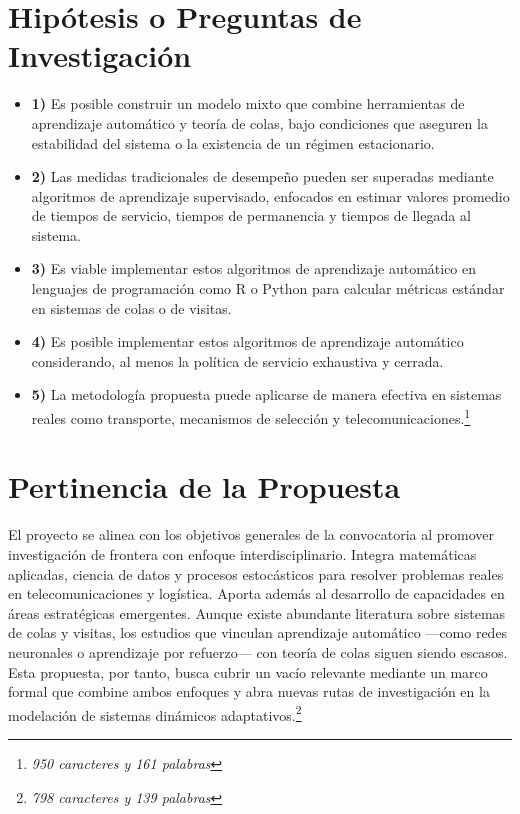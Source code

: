 \documentclass[12pt]{article}
\begin{document}
\section{Hipótesis o Preguntas de Investigación}
\begin{itemize}
  \item \textbf{1)} Es posible construir un modelo mixto que combine herramientas de aprendizaje automático y teoría de colas, bajo condiciones que aseguren la estabilidad del sistema o la existencia de un régimen estacionario.

  \item \textbf{2)} Las medidas tradicionales de desempeño pueden ser superadas mediante algoritmos de aprendizaje supervisado, enfocados en estimar valores promedio de tiempos de servicio, tiempos de permanencia y tiempos de llegada al sistema.

  \item \textbf{3)} Es viable implementar estos algoritmos de aprendizaje automático en lenguajes de programación como R o Python para calcular métricas estándar en sistemas de colas o de visitas.
  
  \item \textbf{4)} Es posible  implementar estos algoritmos de aprendizaje automático considerando, al menos la política de servicio exhaustiva y cerrada.

  \item \textbf{5)} La metodología propuesta puede aplicarse de manera efectiva en sistemas reales como transporte, mecanismos de selección y telecomunicaciones.\footnote{\textit{950 caracteres y 161 palabras}}
\end{itemize}

\section{Pertinencia de la Propuesta}

El proyecto se alinea con los objetivos generales de la convocatoria al promover investigación de frontera con enfoque interdisciplinario. Integra matemáticas aplicadas, ciencia de datos y procesos estocásticos para resolver problemas reales en telecomunicaciones y logística. Aporta además al desarrollo de capacidades en áreas estratégicas emergentes. Aunque existe abundante literatura sobre sistemas de colas y visitas, los estudios que vinculan aprendizaje automático —como redes neuronales o aprendizaje por refuerzo— con teoría de colas siguen siendo escasos. Esta propuesta, por tanto, busca cubrir un vacío relevante mediante un marco formal que combine ambos enfoques y abra nuevas rutas de investigación en la modelación de sistemas dinámicos adaptativos.\footnote{\textit{798 caracteres y 139 palabras}}
\end{document}
